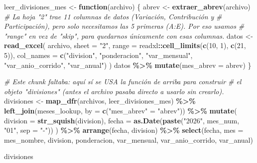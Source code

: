 \documentclass[
]{article}
\newenvironment{Shaded}{\begin{snugshade}}{\end{snugshade}}
\newcommand{\AttributeTok}[1]{\textcolor[rgb]{0.13,0.29,0.53}{#1}}
\newcommand{\CommentTok}[1]{\textcolor[rgb]{0.56,0.35,0.01}{\textit{#1}}}
\newcommand{\ControlFlowTok}[1]{\textcolor[rgb]{0.13,0.29,0.53}{\textbf{#1}}}
\newcommand{\DecValTok}[1]{\textcolor[rgb]{0.00,0.00,0.81}{#1}}
\newcommand{\FunctionTok}[1]{\textcolor[rgb]{0.13,0.29,0.53}{\textbf{#1}}}
\newcommand{\NormalTok}[1]{#1}
\newcommand{\OtherTok}[1]{\textcolor[rgb]{0.56,0.35,0.01}{#1}}
\newcommand{\SpecialCharTok}[1]{\textcolor[rgb]{0.81,0.36,0.00}{\textbf{#1}}}
\newcommand{\StringTok}[1]{\textcolor[rgb]{0.31,0.60,0.02}{#1}}
\begin{document}
\begin{Shaded}
\begin{Highlighting}[]
\NormalTok{leer\_divisiones\_mes }\OtherTok{\textless{}{-}} \ControlFlowTok{function}\NormalTok{(archivo) \{}
\NormalTok{  abrev }\OtherTok{\textless{}{-}} \FunctionTok{extraer\_abrev}\NormalTok{(archivo)}
  \CommentTok{\# La hoja "2" trae 11 columnas de datos (Variación, Contribución y}
  \CommentTok{\# Participación), pero solo necesitamos las 5 primeras (A:E). Por eso usamos}
  \CommentTok{\# "range" en vez de "skip", para quedarnos únicamente con esas columnas.}
\NormalTok{  datos }\OtherTok{\textless{}{-}} \FunctionTok{read\_excel}\NormalTok{(}
\NormalTok{    archivo, }\AttributeTok{sheet =} \StringTok{"2"}\NormalTok{,}
    \AttributeTok{range =}\NormalTok{ readxl}\SpecialCharTok{::}\FunctionTok{cell\_limits}\NormalTok{(}\FunctionTok{c}\NormalTok{(}\DecValTok{10}\NormalTok{, }\DecValTok{1}\NormalTok{), }\FunctionTok{c}\NormalTok{(}\DecValTok{21}\NormalTok{, }\DecValTok{5}\NormalTok{)),}
    \AttributeTok{col\_names =} \FunctionTok{c}\NormalTok{(}\StringTok{"division"}\NormalTok{, }\StringTok{"ponderacion"}\NormalTok{, }\StringTok{"var\_mensual"}\NormalTok{, }\StringTok{"var\_anio\_corrido"}\NormalTok{, }\StringTok{"var\_anual"}\NormalTok{)}
\NormalTok{  )}
\NormalTok{  datos }\SpecialCharTok{\%\textgreater{}\%} \FunctionTok{mutate}\NormalTok{(}\AttributeTok{mes\_abrev =}\NormalTok{ abrev)}
\NormalTok{\}}
\end{Highlighting}
\end{Shaded}

\begin{Shaded}
\begin{Highlighting}[]
\CommentTok{\# Este chunk faltaba: aquí sí se USA la función de arriba para construir}
\CommentTok{\# el objeto "divisiones" (antes el archivo pasaba directo a usarlo sin crearlo).}
\NormalTok{divisiones }\OtherTok{\textless{}{-}} \FunctionTok{map\_dfr}\NormalTok{(archivos, leer\_divisiones\_mes) }\SpecialCharTok{\%\textgreater{}\%}
  \FunctionTok{left\_join}\NormalTok{(meses\_lookup, }\AttributeTok{by =} \FunctionTok{c}\NormalTok{(}\StringTok{"mes\_abrev"} \OtherTok{=} \StringTok{"abrev"}\NormalTok{)) }\SpecialCharTok{\%\textgreater{}\%}
  \FunctionTok{mutate}\NormalTok{(}
    \AttributeTok{division =} \FunctionTok{str\_squish}\NormalTok{(division),}
    \AttributeTok{fecha =} \FunctionTok{as.Date}\NormalTok{(}\FunctionTok{paste}\NormalTok{(}\StringTok{"2026"}\NormalTok{, mes\_num, }\StringTok{"01"}\NormalTok{, }\AttributeTok{sep =} \StringTok{"{-}"}\NormalTok{))}
\NormalTok{  ) }\SpecialCharTok{\%\textgreater{}\%}
  \FunctionTok{arrange}\NormalTok{(fecha, division) }\SpecialCharTok{\%\textgreater{}\%}
  \FunctionTok{select}\NormalTok{(fecha, }\AttributeTok{mes =}\NormalTok{ mes\_nombre, division, ponderacion, var\_mensual, var\_anio\_corrido, var\_anual)}

\NormalTok{divisiones}
\end{Highlighting}
\end{Shaded}
\end{document}

